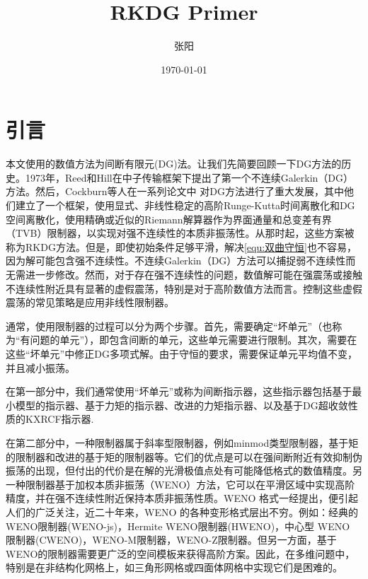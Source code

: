 \documentclass{article}
\title{RKDG Primer}
\author{张阳}
\date{\today}
\numberwithin{equation}{subsection}    %
\begin{document}
\maketitle
\tableofcontents
\newpage
\section{引言}
本文使用的数值方法为间断有限元(DG)法。让我们先简要回顾一下DG方法的历史。1973年，Reed和Hill\cite{Reed_Hill}在中子传输框架下提出了第一个不连续Galerkin（DG）方法。然后，Cockburn等人在一系列论文中 \cite{RKDG2,RKDG3,RKDG4,RKDG5} 对DG方法进行了重大发展，其中他们建立了一个框架，使用显式、非线性稳定的高阶Runge-Kutta时间离散化和DG空间离散化，使用精确或近似的Riemann解算器作为界面通量和总变差有界（TVB）限制器\cite{TVB}，以实现对强不连续性的本质非振荡性。从那时起，这些方案被称为RKDG方法。但是，即使初始条件足够平滑，解决\eqref{equ:双曲守恒}也不容易，因为解可能包含强不连续性。不连续Galerkin（DG）方法可以捕捉弱不连续性而无需进一步修改。然而，对于存在强不连续性的问题，数值解可能在强震荡或接触不连续性附近具有显著的虚假震荡，特别是对于高阶数值方法而言。控制这些虚假震荡的常见策略是应用非线性限制器。

通常，使用限制器的过程可以分为两个步骤。首先，需要确定“坏单元”（也称为“有问题的单元”），即包含间断的单元，这些单元需要进行限制。其次，需要在这些“坏单元”中修正DG多项式解。由于守恒的要求，需要保证单元平均值不变，并且减小振荡。

在第一部分中，我们通常使用“坏单元”或称为间断指示器，这些指示器包括基于最小模型的指示器\cite{RKDG2}、基于力矩的指示器\cite{基于力矩的指示器}、改进的力矩指示器\cite{改进的基于矩的限制器}、以及基于DG超收敛性质的KXRCF指示器\cite{基于DG超收敛性质的KXRCF指示器}.

在第二部分中，一种限制器属于斜率型限制器，例如minmod类型限制器\cite{RKDG2,RKDG3,RKDG4,RKDG5}，基于矩的限制器\cite{基于矩的限制器}和改进的基于矩的限制器\cite{改进的基于矩的限制器}等。它们的优点是可以在强间断附近有效抑制伪振荡的出现，但付出的代价是在解的光滑极值点处有可能降低格式的数值精度。另一种限制器基于加权本质非振荡（WENO）方法\cite{WENO1,WENO2,WENO3,WENO4,WENO5}，它可以在平滑区域中实现高阶精度，并在强不连续性附近保持本质非振荡性质。WENO 格式一经提出，便引起人们的广泛关注，近二十年来，WENO 的各种变形格式层出不穷。例如：经典的WENO限制器(WENO-js)\cite{WENO-js1,WENO-js2}，Hermite WENO限制器(HWENO)\cite{HWENO1,HWENO2}，中心型 WENO 限制器(CWENO)\cite{CWENO}，WENO-M限制器\cite{WENO-M}，WENO-Z限制器\cite{WENO-Z}。但另一方面，基于WENO的限制器需要更广泛的空间模板来获得高阶方案。因此，在多维问题中，特别是在非结构化网格上，如三角形网格或四面体网格中实现它们是困难的。
\end{document}
